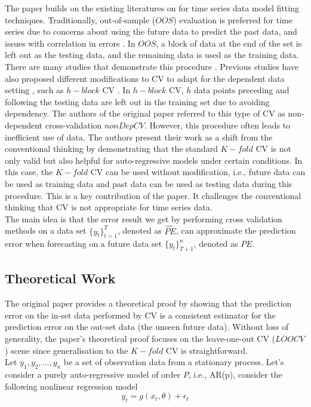 \documentclass[12pt, oneside]{amsart}
\theoremstyle{definition}
\theoremstyle{remark}
\numberwithin{equation}{section}
\begin{document}
The paper builds on the existing literatures on for time series data model fitting techniques. Traditionally, out-of-sample ($OOS$) evaluation is preferred for time series due to concerns about using the future data to predict the past data, and issues with correlation in errors \citep{Bergmeir2018}. In $OOS$, a block of data at the end of the set is left out as the testing data, and the remaining data is used as the training data. There are many studies that demonstrate this procedure \citep{Tashman}. Previous studies have also proposed different modifications to CV to adapt for the dependent data setting \citep{Gyorfi, Burman1992, Burman1994}, such as $h-block$ CV \citep{Burman1994}. In $h-block$ CV, $h$ data points preceding and following the testing data are left out in the training set due to avoiding dependency. The authors of the original paper \citep{Bergmeir2018} referred to this type of CV as non-dependent cross-validation $nonDepCV$. However, this procedure often leads to inefficient use of data. The authors present their work as a shift from the conventional thinking by demonstrating that the standard $K-fold$ CV is not only valid but also helpful for auto-regressive models under certain conditions. In this case, the $K-fold$ CV can be used without modification, i.e., future data can be used as training data and past data can be used as testing data during this procedure. This is a key contribution of the paper. It challenges the conventional thinking that CV is not appropriate for time series data. \\

The main idea is that the error result we get by performing cross validation methods on a data set $\{y_t\}_{t=1}^T$, denoted as $\hat{PE}$, can approximate the prediction error when forecasting on a future data set $\{y_t\}_{T+1}^n$, denoted as $PE$. 

\subsection{Theoretical Work}
The original paper provides a theoretical proof by showing that the prediction error on the in-set data performed by CV is a consistent estimator for the prediction error on the out-set data (the unseen future data). Without loss of generality, the paper's theoretical proof focuses on the leave-one-out CV ($LOOCV$) scene since generalisation to the $K-fold$ CV is straightforward.
\\

Let $y_1, y_2, ..., y_n$ be a set of observation data from a stationary process. Let's consider a purely auto-regressive model of order $P$, i.e., AR(p), consider the following nonlinear regression model
\begin{equation}\label{eq1}
y_t = g(x_t, \theta) + \epsilon_t
\end{equation}
\end{document}
